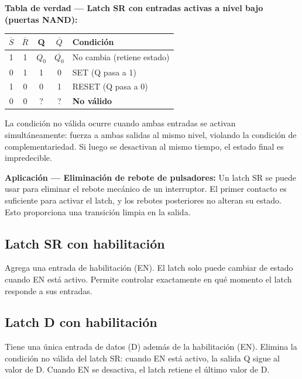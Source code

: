 \textbf{Tabla de verdad --- Latch SR con entradas activas a nivel bajo (puertas NAND):}

\begin{table}[H]
\centering
\begin{tabular}{ccccp{4cm}}
\toprule
$\overline{S}$ & $\overline{R}$ & Q & $\overline{Q}$ & Condición \\
\midrule
1 & 1 & $Q_0$ & $\overline{Q_0}$ & No cambia (retiene estado) \\
0 & 1 & 1 & 0 & SET (Q pasa a 1) \\
1 & 0 & 0 & 1 & RESET (Q pasa a 0) \\
0 & 0 & ? & ? & \textbf{No válido} \\
\bottomrule
\end{tabular}
\end{table}

La condición no válida ocurre cuando ambas entradas se activan simultáneamente: fuerza a ambas salidas al mismo nivel, violando la condición de complementariedad. Si luego se desactivan al mismo tiempo, el estado final es impredecible.


\textbf{Aplicación --- Eliminación de rebote de pulsadores:}
Un latch SR se puede usar para eliminar el rebote mecánico de un interruptor. El primer contacto es suficiente para activar el latch, y los rebotes posteriores no alteran su estado. Esto proporciona una transición limpia en la salida.


\subsection{Latch SR con habilitación}

Agrega una entrada de habilitación (EN). El latch solo puede cambiar de estado cuando EN está activo. Permite controlar exactamente en qué momento el latch responde a sus entradas.


\subsection{Latch D con habilitación}

Tiene una única entrada de datos (D) además de la habilitación (EN). Elimina la condición no válida del latch SR: cuando EN está activo, la salida Q sigue al valor de D. Cuando EN se desactiva, el latch retiene el último valor de D.

